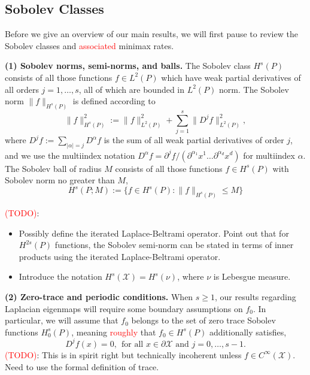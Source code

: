 \documentclass{article}
\newcommand{\1}{\mathbf{1}}
\newcommand{\Leb}{L}
\newcommand{\mc}[1]{\mathcal{#1}}
\theoremstyle{alden}
\theoremstyle{aldenthm}
\theoremstyle{definition}
\theoremstyle{remark}
\begin{document}
\subsection{Sobolev Classes}
\label{sec:sobolev}
Before we give an overview of our main results, we will first pause to review the Sobolev classes and \textcolor{red}{associated} minimax rates.

\textbf{(1) Sobolev norms, semi-norms, and balls.} 
The Sobolev class $H^s(P)$ consists of all those functions $f \in \Leb^2(P)$ which have weak partial derivatives of all orders $j = 1,\ldots,s$, all of which are bounded in $\Leb^2(P)$ norm. The Sobolev norm $\|f\|_{H^s(P)}$ is defined according to
\begin{equation*}
\|f\|_{H^s(P)}^2 := \|f\|_{\Leb^2(P)}^2 + \sum_{j = 1}^{s} \|D^jf\|_{\Leb^2(P)}^2,
\end{equation*}
where $D^jf := \sum_{|\alpha| = j}D^{\alpha}f$ is the sum of all weak partial derivatives of order $j$, and we use the multiindex notation $D^{\alpha}f = \partial^j f/(\partial^{\alpha_1}x^1\ldots \partial^{\alpha_d}x^d)$ for multiindex $\alpha$. The Sobolev ball of radius $M$ consists of all those functions $f \in H^s(P)$ with Sobolev norm no greater than $M$,
\begin{equation*}
H^s(P;M) := \bigl\{f \in H^s(P): \|f\|_{H^s(P)} \leq M\bigr\}
\end{equation*}

\textcolor{red}{(TODO)}: 
\begin{itemize}
	\item Possibly define the iterated Laplace-Beltrami operator. Point out that for $H^{2s}(P)$ functions, the Sobolev semi-norm can be stated in terms of inner products using the iterated Laplace-Beltrami operator.
	\item Introduce the notation $H^s(\mc{X}) = H^s(\nu)$, where $\nu$ is Lebesgue measure.
\end{itemize}

\textbf{(2) Zero-trace and periodic conditions.}
When $s \geq 1$, our results regarding Laplacian eigenmaps will require some boundary assumptions on $f_0$. In particular, we will assume that $f_0$ belongs to the set of zero trace Sobolev functions $H_0^{s}(P)$, meaning \textcolor{red}{roughly} that $f_0 \in H^s(P)$ additionally satisfies,
\begin{equation}
\label{eqn:zero_trace}
D^jf(x) = 0,~~\textrm{for all $x \in \partial \mc{X}$ and $j = 0,\ldots,s - 1$.}
\end{equation}
\textcolor{red}{(TODO)}: This is in spirit right but technically incoherent unless $f \in C^{\infty}(\mc{X})$. Need to use the formal definition of trace.
\end{document}

